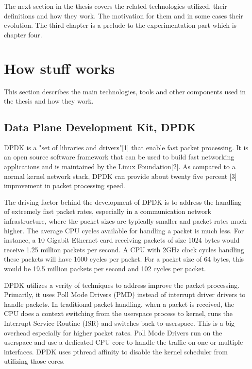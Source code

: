\documentclass[english, 12pt, a4paper, elec, utf8, a-1b, online]{aaltothesis}
\begin{document}

The next section in the thesis covers the related technologies utilized, their definitions and how they work. The motivation for them and in some cases their evolution. The third chapter is a prelude to the experimentation part which is chapter four.

\clearpage
\section{How stuff works}
This section describes the main technologies, tools and other components used in the thesis and how they work.
\subsection{Data Plane Development Kit, DPDK}
DPDK is a "set of libraries and drivers"[1] that enable fast packet processing. It is an open source software framework that can be used to build fast networking applications and is maintained by the Linux Foundation[2]. As compared to a normal kernel network stack, DPDK can provide about twenty five percent [3] improvement in packet processing speed.

The driving factor behind the development of DPDK is to address the handling of extremely fast packet rates, especially in a communication network infrastructure, where the packet sizes are typically smaller and packet rates much higher. The average CPU cycles available for handling a packet is much less. For instance, a 10 Gigabit Ethernet card receiving packets of size 1024 bytes would receive 1.25 million packets per second. A CPU with 2GHz clock cycles handling these packets will have 1600 cycles per packet. For a packet size of 64 bytes, this would be 19.5 million packets per second and 102 cycles per packet. 

DPDK utilizes a verity of techniques to address improve the packet processing. Primarily, it uses Poll Mode Drivers (PMD) instead of interrupt driver drivers to handle packets. In traditional packet handling, when a packet is received, the CPU does a context switching from the userspace process to kernel, runs the Interrupt Service Routine (ISR) and switches back to userspace. This is a big overhead especially for higher packet rates. Poll Mode Drivers run on the userspace and use a dedicated CPU core to handle the traffic on one or multiple interfaces. DPDK uses pthread affinity to disable the kernel scheduler from utilizing those cores.
\end{document}
